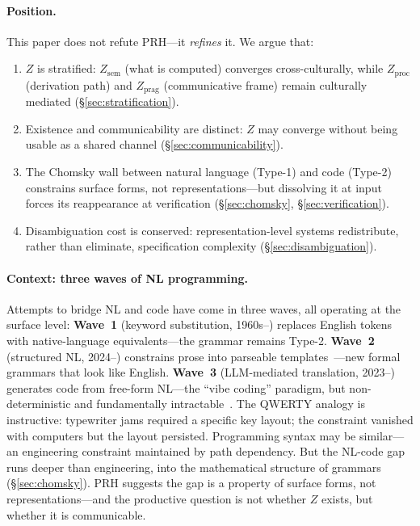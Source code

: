 \documentclass[11pt]{article}
\theoremstyle{definition}
\newcommand{\Zsem}{Z_{\text{sem}}}
\newcommand{\Zproc}{Z_{\text{proc}}}
\newcommand{\Zprag}{Z_{\text{prag}}}
\begin{document}
\paragraph{Position.} This paper does not refute PRH---it \emph{refines} it. We argue that:
\begin{enumerate}[label=(\roman*),nosep]
  \item $Z$ is stratified: $\Zsem$ (what is computed) converges cross-culturally, while $\Zproc$ (derivation path) and $\Zprag$ (communicative frame) remain culturally mediated (\S\ref{sec:stratification}).
  \item Existence and communicability are distinct: $Z$ may converge without being usable as a shared channel (\S\ref{sec:communicability}).
  \item The Chomsky wall between natural language (Type-1) and code (Type-2) constrains surface forms, not representations---but dissolving it at input forces its reappearance at verification (\S\ref{sec:chomsky}, \S\ref{sec:verification}).
  \item Disambiguation cost is conserved: representation-level systems redistribute, rather than eliminate, specification complexity (\S\ref{sec:disambiguation}).
\end{enumerate}

\paragraph{Context: three waves of NL programming.} Attempts to bridge NL and code have come in three waves, all operating at the surface level: \textbf{Wave~1} (keyword substitution, 1960s--) replaces English tokens with native-language equivalents---the grammar remains Type-2. \textbf{Wave~2} (structured NL, 2024--) constrains prose into parseable templates~\cite{core2025,elliott2023sudolang}---new formal grammars that look like English. \textbf{Wave~3} (LLM-mediated translation, 2023--) generates code from free-form NL---the ``vibe coding'' paradigm, but non-deterministic and fundamentally intractable~\cite{icse2026reproducibility}. The QWERTY analogy is instructive: typewriter jams required a specific key layout; the constraint vanished with computers but the layout persisted. Programming syntax may be similar---an engineering constraint maintained by path dependency. But the NL-code gap runs deeper than engineering, into the mathematical structure of grammars (\S\ref{sec:chomsky}). PRH suggests the gap is a property of surface forms, not representations---and the productive question is not whether $Z$ exists, but whether it is communicable.
\end{document}
